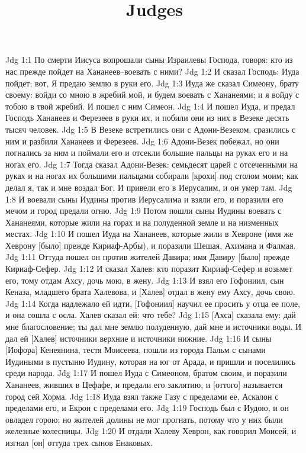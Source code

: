 

\title{Judges}

Jdg 1:1  По смерти Иисуса вопрошали сыны Израилевы Господа, говоря: кто из нас прежде пойдет на Хананеев--воевать с ними?
Jdg 1:2  И сказал Господь: Иуда пойдет; вот, Я предаю землю в руки его.
Jdg 1:3  Иуда же сказал Симеону, брату своему: войди со мною в жребий мой, и будем воевать с Хананеями; и я войду с тобою в твой жребий. И пошел с ним Симеон.
Jdg 1:4  И пошел Иуда, и предал Господь Хананеев и Ферезеев в руки их, и побили они из них в Везеке десять тысяч человек.
Jdg 1:5  В Везеке встретились они с Адони-Везеком, сразились с ним и разбили Хананеев и Ферезеев.
Jdg 1:6  Адони-Везек побежал, но они погнались за ним и поймали его и отсекли большие пальцы на руках его и на ногах его.
Jdg 1:7  Тогда сказал Адони-Везек: семьдесят царей с отсеченными на руках и на ногах их большими пальцами собирали [крохи] под столом моим; как делал я, так и мне воздал Бог. И привели его в Иерусалим, и он умер там.
Jdg 1:8  И воевали сыны Иудины против Иерусалима и взяли его, и поразили его мечом и город предали огню.
Jdg 1:9  Потом пошли сыны Иудины воевать с Хананеями, которые жили на горах и на полуденной земле и на низменных местах.
Jdg 1:10  И пошел Иуда на Хананеев, которые жили в Хевроне (имя же Хеврону [было] прежде Кириаф-Арбы), и поразили Шешая, Ахимана и Фалмая.
Jdg 1:11  Оттуда пошел он против жителей Давира; имя Давиру [было] прежде Кириаф-Сефер.
Jdg 1:12  И сказал Халев: кто поразит Кириаф-Сефер и возьмет его, тому отдам Ахсу, дочь мою, в жену.
Jdg 1:13  И взял его Гофониил, сын Кеназа, младшего брата Халевова, и [Халев] отдал в жену ему Ахсу, дочь свою.
Jdg 1:14  Когда надлежало ей идти, [Гофониил] научил ее просить у отца ее поле, и она сошла с осла. Халев сказал ей: что тебе?
Jdg 1:15  [Ахса] сказала ему: дай мне благословение; ты дал мне землю полуденную, дай мне и источники воды. И дал ей [Халев] источники верхние и источники нижние.
Jdg 1:16  И сыны [Иофора] Кенеянина, тестя Моисеева, пошли из города Пальм с сынами Иудиными в пустыню Иудину, которая на юг от Арада, и пришли и поселились среди народа.
Jdg 1:17  И пошел Иуда с Симеоном, братом своим, и поразили Хананеев, живших в Цефафе, и предали его заклятию, и [оттого] называется город сей Хорма.
Jdg 1:18  Иуда взял также Газу с пределами ее, Аскалон с пределами его, и Екрон с пределами его.
Jdg 1:19  Господь был с Иудою, и он овладел горою; но жителей долины не мог прогнать, потому что у них были железные колесницы.
Jdg 1:20  И отдали Халеву Хеврон, как говорил Моисей, и изгнал [он] оттуда трех сынов Енаковых.
